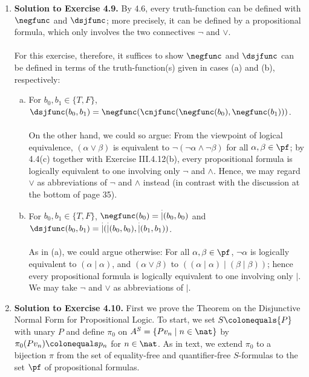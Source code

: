 \begin{enumerate}[1.]
%
\item \textbf{Solution to Exercise 4.9.} By 4.6, every truth-function can be defined with $\negfunc$ and $\dsjfunc$; more precisely, it can be defined by a propositional formula, which only involves the two connectives $\neg$ and $\lor$.\\
\ \\
For this exercise, therefore, it suffices to show $\negfunc$ and $\dsjfunc$ can be defined in terms of the truth-function(s) given in cases (a) and (b), respectively:
\begin{enumerate}[(a)]
\item For $b_0, b_1 \in \{ T, F \}$, $\dsjfunc (b_0, b_1) = \negfunc (\cnjfunc (\negfunc (b_0), \negfunc (b_1)))$.\\
\ \\
On the other hand, we could so argue: From the viewpoint of logical equivalence, $(\alpha \lor \beta)$ is equivalent to $\neg (\neg \alpha \land \neg \beta)$ for all $\alpha, \beta \in \pf$; by 4.4(c) together with Exercise III.4.12(b), every propositional formula is logically equivalent to one involving only $\neg$ and $\land$. Hence, we may regard $\lor$ as abbreviations of $\neg$ and $\land$ instead (in contrast with the discussion at the bottom of page 35).
\item For $b_0, b_1 \in \{ T, F \}$, $\negfunc (b_0) = \mathop{\stackrel{.}{|}} (b_0, b_0)$ and $\dsjfunc (b_0, b_1) = \mathop{\stackrel{.}{|}}(\mathop{\stackrel{.}{|}}(b_0, b_0), \mathop{\stackrel{.}{|}}(b_1, b_1))$.\\
\ \\
As in (a), we could argue otherwise: For all $\alpha, \beta \in \pf$, $\neg\alpha$ is logically equivalent to $(\alpha \mathop{|} \alpha)$, and $(\alpha \lor \beta)$ to $((\alpha \mathop{|} \alpha) \mathop{|} (\beta \mathop{|} \beta))$; hence every propositional formula is logically equivalent to one involving only $\mathop{|}$. We may take $\neg$ and $\lor$ as abbreviations of $\mathop{|}$.
\end{enumerate}
%
\item \textbf{Solution to Exercise 4.10.} First we prove the Theorem on the Disjunctive Normal Form for Propositional Logic. To start, we set $S \colonequals \{ P \}$ with unary $P$ and define $\pi_0$ on $A^S = \{ Pv_n \mid n \in \nat \}$ by $\pi_0 ( Pv_n ) \colonequals p_n$ for $n \in \nat$. As in text, we extend $\pi_0$ to a bijection $\pi$ from the set of equality-free and quantifier-free $S$-formulas to the set $\pf$ of propositional formulas.\\

\end{enumerate}
